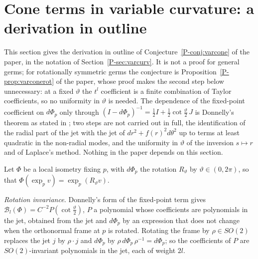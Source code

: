 \documentclass[pdflatex,sn-mathphys-num]{sn-jnl}
\newcommand{\pref}[1]{\ref*{P-#1}}%
\theoremstyle{thmstyleone}%
\theoremstyle{thmstylethree}%
\begin{document}
\section{Cone terms in variable curvature: a derivation in outline}\label{sec:varconeoutline}

This section gives the derivation in outline of Conjecture~\pref{conj:varcone} of the paper, in the notation of Section~\pref{sec:varcurv}. It is not a proof for general germs; for rotationally symmetric germs the conjecture is Proposition~\pref{prop:varconerot} of the paper, whose proof makes the second step below unnecessary: at a fixed $\vartheta$ the $t^l$ coefficient is a finite combination of Taylor coefficients, so no uniformity in $\vartheta$ is needed. The dependence of the fixed-point coefficient on $d\Phi_p$ only through $(I-d\Phi_p)^{-1}=\frac12I+\frac12\cot\frac\vartheta2\,J$ is Donnelly's theorem as stated in \cite[4.2]{dggw2008}; two steps are not carried out in full, the identification of the radial part of the jet with the jet of $dr^2+f(r)^2d\theta^2$ up to terms at least quadratic in the non-radial modes, and the uniformity in $\vartheta$ of the inversion $s\mapsto r$ and of Laplace's method. Nothing in the paper depends on this section.

Let $\Phi$ be a local isometry fixing $p$, with $d\Phi_p$ the rotation $R_\vartheta$ by $\vartheta\in(0,2\pi)$, so that $\Phi(\exp_pv)=\exp_p(R_\vartheta v)$.

\emph{Rotation invariance.} Donnelly's form of the fixed-point term \cite[4.2]{dggw2008} gives $\mathcal B_l(\Phi)=C^{-2}P(\cot\frac\vartheta2)$, $P$ a polynomial whose coefficients are polynomials in the jet, obtained from the jet and $d\Phi_p$ by an expression that does not change when the orthonormal frame at $p$ is rotated. Rotating the frame by $\rho\in SO(2)$ replaces the jet $j$ by $\rho\cdot j$ and $d\Phi_p$ by $\rho\,d\Phi_p\,\rho^{-1}=d\Phi_p$; so the coefficients of $P$ are $SO(2)$-invariant polynomials in the jet, each of weight $2l$.
\end{document}

